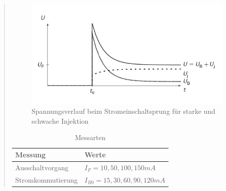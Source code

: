 \begin{quote}
    \begin{figure}[h]
        \centering
        \includegraphics[scale=1]{Bilder/Stromeinschalten}
        \caption{Spannungsverlauf beim Stromeinschaltsprung für starke und schwache Injektion \footnotemark} 
        \label{fig:Stromeinschalten}
    \end{figure} 
   
   \newpage   

      \begin{table}[h]
               \begin{addmargin}[-1cm]{3cm}
               \centering
                    \begin{tabular}{|p{5cm}|p{11.2cm}|}
         \hline
         Messung  &   Werte\\
         \hline
         Ausschaltvorgang  & $I_{F}=10, 50, 100, 150 mA$\\
   
         \hline
         Stromkommutierung  &  $I_{R0}=15,30,60,90,120 mA$\\ 
         
         \hline
         

                    \end{tabular}
                \end{addmargin}
             \caption{Messarten}
          \label{Messarten}
      \end{table} 
     
      \vspace{2em}


\end{quote}
